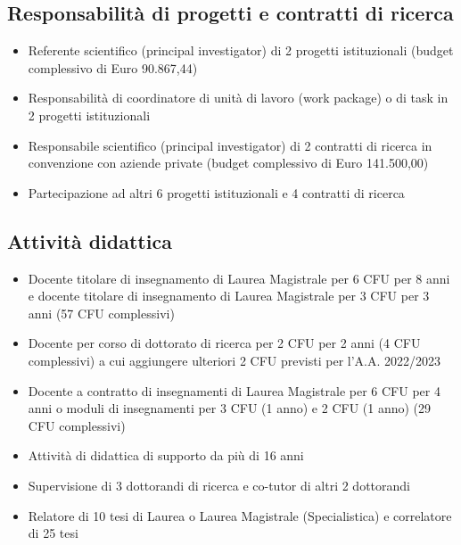 \documentclass[11pt]{article}
\begin{document}

\subsection*{Responsabilit\`a di progetti e contratti di ricerca}

\begin{itemize}
\item Referente scientifico (principal investigator) di 2 progetti istituzionali (budget complessivo di Euro 90.867,44)
\item Responsabilit\`a di coordinatore di unit\`a di lavoro (work package) o di task in 2 progetti istituzionali
\item Responsabile scientifico (principal investigator) di 2 contratti di ricerca in convenzione con aziende private (budget complessivo di Euro 141.500,00)
\item Partecipazione ad altri 6 progetti istituzionali e 4 contratti di ricerca
\end{itemize}


\subsection*{Attivit\`a didattica}

\begin{itemize}
\item Docente titolare di insegnamento di Laurea Magistrale per 6 CFU per 8 anni e docente titolare di insegnamento di Laurea Magistrale per 3 CFU per 3 anni (57 CFU complessivi)
\item Docente per corso di dottorato di ricerca per 2 CFU per 2 anni (4 CFU complessivi) a cui aggiungere ulteriori 2 CFU previsti per l'A.A. 2022/2023
\item Docente a contratto di insegnamenti di Laurea Magistrale per 6 CFU per 4 anni o moduli di insegnamenti per 3 CFU (1 anno) e 2 CFU (1 anno) (29 CFU complessivi) 
\item Attivit\`a di didattica di supporto da pi\`u di 16 anni
\item Supervisione di 3 dottorandi di ricerca e co-tutor di altri 2 dottorandi
\item Relatore di 10 tesi di Laurea o Laurea Magistrale (Specialistica) e correlatore di 25 tesi
\end{itemize}
\end{document}
